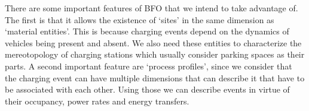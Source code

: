 There are some important features of BFO that we intend to take advantage of.
The first is that it allows the existence of `sites' in the same dimension as
`material entities'. This is because charging events depend on the dynamics of
vehicles being present and absent. We also need these entities to characterize
the mereotopology of charging stations which usually consider parking spaces as
their parts. A second important feature are `process profiles', since we
consider that the charging event can have multiple dimensions that can describe
it that have to be associated with each other. Using those we can describe
events in virtue of their occupancy, power rates and energy transfers.
